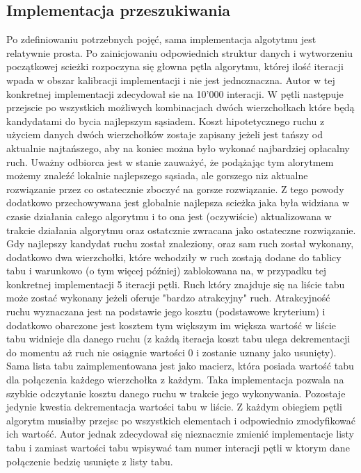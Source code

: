 \documentclass[polish,polish,a4paper]{article}
\begin{document}
\subsection{Implementacja przeszukiwania}
Po zdefiniowaniu potrzebnych pojęć, sama implementacja algotytmu jest relatywnie prosta. Po zainicjowaniu odpowiednich struktur
danych i wytworzeniu początkowej scieżki rozpoczyna się głowna pętla algorytmu, której ilość iteracji wpada w obszar kalibracji
implementacji i nie jest jednoznaczna. Autor w tej konkretnej implementacji zdecydował sie na 10'000 interacji. W pętli następuje
przejscie po wszystkich możliwych kombinacjach dwóch wierzchołkach które będą kandydatami do bycia najlepszym sąsiadem.
Koszt hipotetycznego ruchu z użyciem danych dwóch wierzchołków zostaje zapisany jeżeli jest tańszy od aktualnie najtańszego, aby
na koniec można było wykonać najbardziej opłacalny ruch. Uważny odbiorca jest w stanie zauważyć, że podążając tym alorytmem możemy
znaleźć lokalnie najlepszego sąsiada, ale gorszego niz aktualne rozwiązanie przez co ostatecznie zboczyć na gorsze rozwiązanie.
Z tego powody dodatkowo przechowywana jest globalnie najlepsza scieżka jaka była widziana w czasie działania całego algorytmu i to
ona jest (oczywiście) aktualizowana w trakcie działania algorytmu oraz ostatcznie zwracana jako ostateczne rozwiązanie.
Gdy najlepszy kandydat ruchu został znaleziony, oraz sam ruch został wykonany, dodatkowo dwa wierzchołki, które wchodziły w ruch
zostają dodane do tablicy tabu i warunkowo (o tym więcej później) zablokowana na, w przypadku tej konkretnej implementacji 5
iteracji pętli. Ruch który znajduje się na liście tabu może zostać wykonany jeżeli oferuje "bardzo atrakcyjny" ruch. Atrakcyjność
ruchu wyznaczana jest na podstawie jego kosztu (podstawowe kryterium) i dodatkowo obarczone jest kosztem tym większym im większa
wartość w liście tabu widnieje dla danego ruchu (z każdą iteracja koszt tabu ulega dekrementacji do momentu aż ruch nie osiągnie
wartości 0 i zostanie uznany jako usunięty). Sama lista tabu zaimplementowana jest jako macierz, która posiada wartość tabu dla
połączenia każdego wierzchołka z każdym. Taka implementacja pozwala na szybkie odczytanie kosztu danego ruchu w trakcie jego
wykonywania. Pozostaje jedynie kwestia dekrementacja wartości tabu w liście. Z każdym obiegiem pętli algorytm musiałby przejsc
po wszystkich elementach i odpowiednio zmodyfikować ich wartość. Autor jednak zdecydował się nieznacznie zmienić implementacje
listy tabu i zamiast wartości tabu wpisywać tam numer interacji pętli w ktorym dane połączenie bedzię usunięte z listy tabu.
\end{document}
